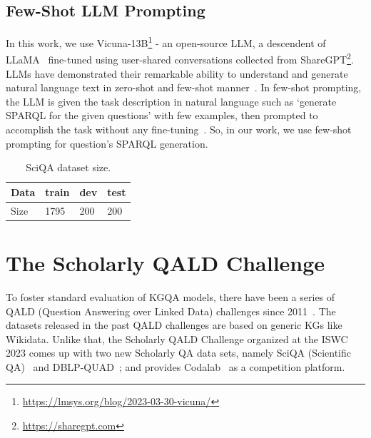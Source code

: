 \documentclass[
]{ceurart}
\begin{document}
\subsection{Few-Shot LLM Prompting}\label{few-shot-prompting}

In this work, we use Vicuna-13B\footnote{\url{https://lmsys.org/blog/2023-03-30-vicuna/}} - an open-source LLM, a descendent of LLaMA~\cite{touvron2023llama} fine-tuned using user-shared conversations collected from ShareGPT\footnote{\url{https://sharegpt.com}}. LLMs have demonstrated their remarkable ability to understand and generate natural language text in zero-shot and few-shot manner~\cite{NEURIPS2020_1457c0d6, baek-etal-2023-knowledge, chen-2023-large}. In few-shot prompting, the LLM is given the task description in natural language such as `generate SPARQL for the given questions' with few examples, then prompted to accomplish the task without any fine-tuning~\cite{chen-2023-large, sorensen-etal-2022-information}. So, in our work, we use few-shot prompting for question's SPARQL generation.

\begin{table}[htb!]
  \caption{SciQA dataset size.}
  \label{tab:sciqa_size}
  \begin{tabular}{llll}
    \toprule
     Data & train & dev & test \\
    \midrule
    Size & 1795 & 200 & 200 \\
    \bottomrule
  \end{tabular}
\end{table}

\section{The Scholarly QALD Challenge}\label{sciqa-dataset}

To foster standard evaluation of KGQA models, there have been a series of QALD (Question Answering over Linked Data) challenges since 2011~\cite{usbeckqald}. The datasets released in the past QALD challenges are based on generic KGs like Wikidata. Unlike that, the Scholarly QALD Challenge organized at the ISWC 2023 comes up with two new Scholarly QA data sets, namely SciQA (Scientific QA)~\cite{auer2023sciqa} and DBLP-QUAD~\cite{banerjee2023dblp}; and provides Codalab~\cite{codalab_competitions_JMLR} as a competition platform.
\end{document}
